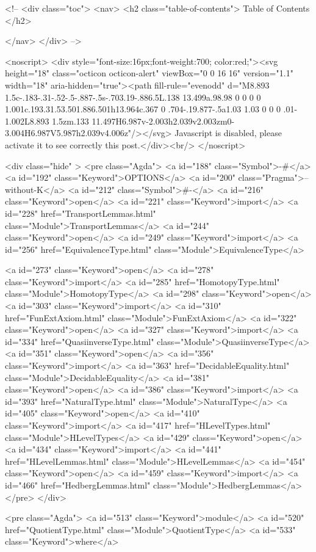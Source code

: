   <!-- 
  <div class="toc">
    <nav>
    <h2 class="table-of-contents"> Table of Contents </h2>
      

    </nav>
  </div>
   -->

  <noscript>
  <div style="font-size:16px;font-weight:700; color:red;"><svg height="18" class="octicon octicon-alert" viewBox="0 0 16 16" version="1.1" width="18" aria-hidden="true"><path fill-rule="evenodd" d="M8.893 1.5c-.183-.31-.52-.5-.887-.5s-.703.19-.886.5L.138 13.499a.98.98 0 0 0 0 1.001c.193.31.53.501.886.501h13.964c.367 0 .704-.19.877-.5a1.03 1.03 0 0 0 .01-1.002L8.893 1.5zm.133 11.497H6.987v-2.003h2.039v2.003zm0-3.004H6.987V5.987h2.039v4.006z"/></svg> Javascript is disabled, please activate it to see correctly this post.</div><br/>
  </noscript>

  <div class="hide" >
<pre class="Agda">
<a id="188" class="Symbol">{-#</a> <a id="192" class="Keyword">OPTIONS</a> <a id="200" class="Pragma">--without-K</a> <a id="212" class="Symbol">#-}</a>
<a id="216" class="Keyword">open</a> <a id="221" class="Keyword">import</a> <a id="228" href="TransportLemmas.html" class="Module">TransportLemmas</a>
<a id="244" class="Keyword">open</a> <a id="249" class="Keyword">import</a> <a id="256" href="EquivalenceType.html" class="Module">EquivalenceType</a>

<a id="273" class="Keyword">open</a> <a id="278" class="Keyword">import</a> <a id="285" href="HomotopyType.html" class="Module">HomotopyType</a>
<a id="298" class="Keyword">open</a> <a id="303" class="Keyword">import</a> <a id="310" href="FunExtAxiom.html" class="Module">FunExtAxiom</a>
<a id="322" class="Keyword">open</a> <a id="327" class="Keyword">import</a> <a id="334" href="QuasiinverseType.html" class="Module">QuasiinverseType</a>
<a id="351" class="Keyword">open</a> <a id="356" class="Keyword">import</a> <a id="363" href="DecidableEquality.html" class="Module">DecidableEquality</a>
<a id="381" class="Keyword">open</a> <a id="386" class="Keyword">import</a> <a id="393" href="NaturalType.html" class="Module">NaturalType</a>
<a id="405" class="Keyword">open</a> <a id="410" class="Keyword">import</a> <a id="417" href="HLevelTypes.html" class="Module">HLevelTypes</a>
<a id="429" class="Keyword">open</a> <a id="434" class="Keyword">import</a> <a id="441" href="HLevelLemmas.html" class="Module">HLevelLemmas</a>
<a id="454" class="Keyword">open</a> <a id="459" class="Keyword">import</a> <a id="466" href="HedbergLemmas.html" class="Module">HedbergLemmas</a>
</pre>
</div>


<pre class="Agda">
<a id="513" class="Keyword">module</a> <a id="520" href="QuotientType.html" class="Module">QuotientType</a> <a id="533" class="Keyword">where</a>


